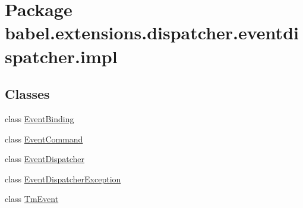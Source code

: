 \hypertarget{namespacebabel_1_1extensions_1_1dispatcher_1_1eventdispatcher_1_1impl}{\section{Package babel.\-extensions.\-dispatcher.\-eventdispatcher.\-impl}
\label{namespacebabel_1_1extensions_1_1dispatcher_1_1eventdispatcher_1_1impl}
}
\subsection*{Classes}
\begin{DoxyCompactItemize}
\item 
class \hyperlink{classbabel_1_1extensions_1_1dispatcher_1_1eventdispatcher_1_1impl_1_1_event_binding}{Event\-Binding}
\item 
class \hyperlink{classbabel_1_1extensions_1_1dispatcher_1_1eventdispatcher_1_1impl_1_1_event_command}{Event\-Command}
\item 
class \hyperlink{classbabel_1_1extensions_1_1dispatcher_1_1eventdispatcher_1_1impl_1_1_event_dispatcher}{Event\-Dispatcher}
\item 
class \hyperlink{classbabel_1_1extensions_1_1dispatcher_1_1eventdispatcher_1_1impl_1_1_event_dispatcher_exception}{Event\-Dispatcher\-Exception}
\item 
class \hyperlink{classbabel_1_1extensions_1_1dispatcher_1_1eventdispatcher_1_1impl_1_1_tm_event}{Tm\-Event}
\end{DoxyCompactItemize}

